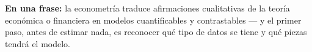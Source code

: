 \documentclass[11pt,a4paper,oneside]{article}
\theoremstyle{definition}
\begin{document}
\begin{summaryBox}
\textbf{En una frase:} la econometría traduce afirmaciones cualitativas de
la teoría económica o financiera en modelos cuantificables y contrastables
--- y el primer paso, antes de estimar nada, es reconocer qué tipo de datos
se tiene y qué piezas tendrá el modelo.
\end{summaryBox}
\end{document}

